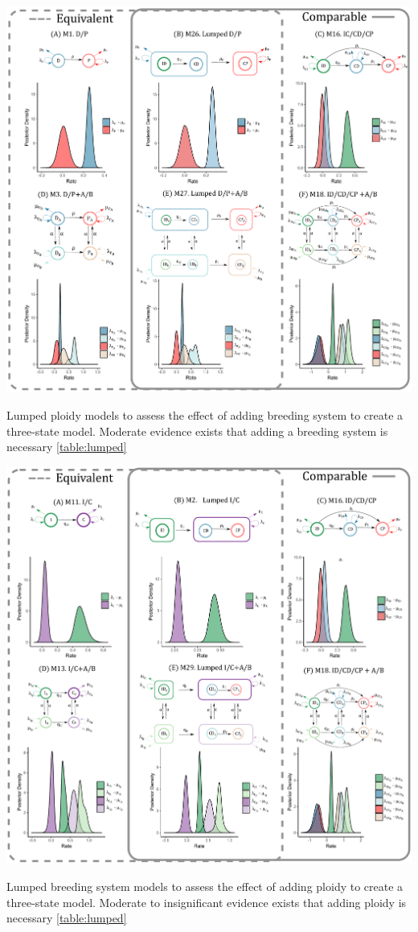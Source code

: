\begin{suppfigure}
\includegraphics[width=\textwidth]{comparablesDP.pdf}
\caption{Lumped ploidy models to assess the effect of adding breeding system to create a three-state model. Moderate evidence exists that adding a breeding system is necessary \cref{table:lumped} } %
\label{suppfigure:lumpedDP}
\end{suppfigure}

\begin{suppfigure}
\includegraphics[width=\textwidth]{comparablesIC.pdf}
\caption{Lumped breeding system models to assess the effect of adding ploidy to create a three-state model. Moderate to insignificant evidence exists that adding ploidy is necessary \cref{table:lumped} } %
\label{suppfigure:lumpedIC}
\end{suppfigure}


